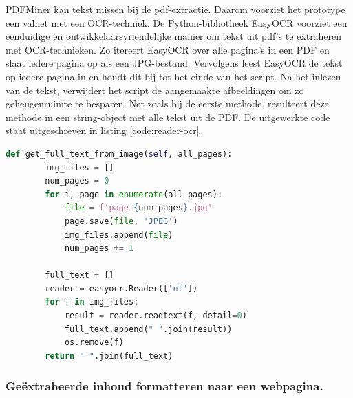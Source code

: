 PDFMiner kan tekst missen bij de pdf-extractie. Daarom voorziet het prototype een valnet met een OCR-techniek. De Python-bibliotheek EasyOCR voorziet een eenduidige en ontwikkelaarsvriendelijke manier om tekst uit pdf's te extraheren met OCR-technieken. Zo itereert EasyOCR over alle pagina's in een PDF en slaat iedere pagina op als een JPG-bestand. Vervolgens leest EasyOCR de tekst op iedere pagina in en houdt dit bij tot het einde van het script. Na het inlezen van de tekst, verwijdert het script de aangemaakte afbeeldingen om zo geheugenruimte te besparen. Net zoals bij de eerste methode, resulteert deze methode in een string-object met alle tekst uit de PDF. De uitgewerkte code staat uitgeschreven in listing \ref{code:reader-ocr}

\begin{lstlisting}[language=Python, caption={Een PDF inlezen met OCR}, label={code:reader-ocr}]
	def get_full_text_from_image(self, all_pages):
		img_files = []
		num_pages = 0
		for i, page in enumerate(all_pages):
			file = f'page_{num_pages}.jpg'
			page.save(file, 'JPEG')
			img_files.append(file)
			num_pages += 1
		
		full_text = []
		reader = easyocr.Reader(['nl'])
		for f in img_files:
			result = reader.readtext(f, detail=0)
			full_text.append(" ".join(result))
			os.remove(f)
		return " ".join(full_text)
\end{lstlisting}

\subsubsection{Geëxtraheerde inhoud formatteren naar een webpagina.}

